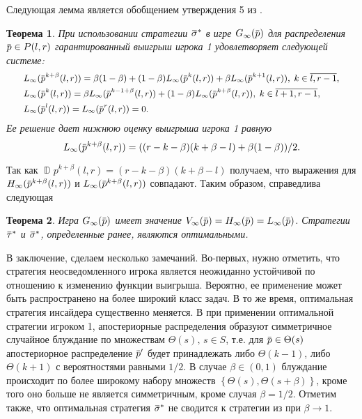 \documentclass[12pt, draft]{extarticle}
\newtheorem{theorem}{Теорема}
\newcommand{\overbar}[1]%
{\mkern 1.5mu\overline{\mkern-1.3mu#1\mkern-1.3mu}\mkern 1.3mu}
\newcommand{\p}{\ensuremath{\overbar{p}}}
\DeclareMathOperator{\D}{\mathbb{D}}
\newcommand{\G}[1][n]{\ensuremath{G_{#1}}}
\newcommand{\V}[1][n]{\ensuremath{V_{#1}}}
\newcommand{\High}[1][\ensuremath{\infty}]{\ensuremath{H_{#1}}}
\newcommand{\sigmav}{\ensuremath{\overbar{\sigma}}}
\newcommand{\tauv}{\ensuremath{\overbar{\tau}}}
\newcommand{\Low}[1][\ensuremath{\infty}]{\ensuremath{L_{#1}}}
\begin{document}
Следующая лемма является обобщением утверждения 5 из \cite{bib:pyanykh16}.
\begin{theorem}
  \label{lower-bound:theorem}
  При использовании стратегии $\sigmav^*$ в игре $\G[\infty](\p)$ для
  распределения %
  $\p \in P(l,r)$ %
  гарантированный выигрыш игрока 1 удовлетворяет следующей системе:
  \begin{equation}
    \small
    \label{lower-bound:eq:Linf-recurrence}
    \begin{aligned}
      &\Low(\p^{k+\beta}(l,r)) =
      \beta(1-\beta) + (1-\beta) \Low(\p^k(l, r)) + \beta \Low(\p^{k+1}(l, r)), \;
      k \in \overline{l, r - 1}, \\
      &\Low(\p^k(l,r)) =
      \beta \Low(\p^{k-1+\beta}(l, r)) + (1-\beta) \Low(\p^{k+\beta}(l, r)), \;
      k \in \overline{l + 1, r - 1},\\
      &\Low(\p^l(l,r)) = \Low(\p^r(l,r)) = 0.
    \end{aligned}
  \end{equation}
  Ее решение дает нижнюю оценку выигрыша игрока 1 равную
  \begin{equation*}
    \label{lower-bound:eq:Linf-recurrence-solution}
    \Low(\p^{k+\beta}(l, r)) = ((r-k-\beta)(k+\beta-l) + \beta(1-\beta))/2.
  \end{equation*}
\end{theorem}

Так как $\D p^{k+\beta}(l, r) = (r-k-\beta)(k+\beta-l)$ получаем, что выражения
для $\High(\p^{k+\beta}(l,r))$ и $\Low(\p^{k+\beta}(l,r))$ совпадают. Таким
образом, справедлива следующая
\begin{theorem}
  \label{solution:theorem}
  Игра $\G[\infty](\p)$ имеет значение $\V[\infty](\p) = \High(\p) = \Low(\p)$.
  Стратегии $\tauv^*$ и $\sigmav^*$, определенные ранее, являются оптимальными.
\end{theorem}

В заключение, сделаем несколько замечаний. Во-первых, нужно отметить, что
стратегия неосведомленного игрока является неожиданно устойчивой по отношению к
изменению функции выигрыша. Вероятно, ее применение может быть распространено на
более широкий класс задач. В то же время, оптимальная стратегия инсайдера
существенно меняется. В \cite{bib:domansky11} при применении оптимальной
стратегии игроком 1, апостериорные распределения образуют симметричное случайное
блуждание по множествам $\Theta(s), \, s \in S$, т.е. для $\p \in \Theta(s)$
апостериорное распределение $\p'$ будет принадлежать либо $\Theta(k-1)$, либо
$\Theta(k+1)$ с вероятностями равными $1/2$. В случае $\beta \in (0, 1)$
блуждание происходит по более широкому набору множеств %
$\left\{ \Theta(s), \Theta(s+\beta) \right\}$, %
кроме того оно больше не является симметричным, кроме случая $\beta = 1/2$.
Отметим также, что оптимальная стратегия $\sigmav^*$ не сводится к стратегии из
\cite{bib:domansky11} при $\beta \rightarrow 1$.
\end{document}
